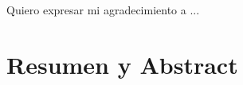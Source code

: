 \documentclass[11pt, oneside]{book}
\author{Nombre Apellido1 Apellido2}
\begin{document}
\frontmatter

\portada
\begin{dedicatoria}

Quiero expresar mi agradecimiento a ...

\end{dedicatoria}





\chapter*{Resumen y Abstract}




\mainmatter
\marcagua



 \cleardoublepage
 

\appendix




 \clearpage
 \backmatter

\end{document}
